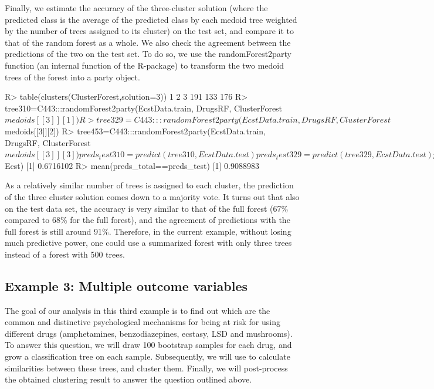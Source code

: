 Finally, we estimate the accuracy of the three-cluster solution (where the predicted class is the average of the predicted class by each medoid tree weighted by the number of trees assigned to its cluster) on the test set, and compare it to that of the random forest as a whole. We also check the agreement between the predictions of the two on the test set. To do so, we use the randomForest2party function (an internal function of the R-package) to transform the two medoid trees of the forest into a party object. 
\begin{example}
R> table(clusters(ClusterForest,solution=3))
  1   2   3 
191 133 176 
R> tree310=C443:::randomForest2party(EcstData.train, DrugsRF, ClusterForest$medoids[[3]][1])
R> tree329=C443:::randomForest2party(EcstData.train, DrugsRF, ClusterForest$medoids[[3]][2])
R> tree453=C443:::randomForest2party(EcstData.train, DrugsRF, ClusterForest$medoids[[3]][3])

preds_test310=predict(tree310,EcstData.test )
preds_test329=predict(tree329,EcstData.test )
preds_test453= predict(tree453,EcstData.test )
preds_total = round(((as.numeric(preds_test310)-1)*table(clusters(ClusterForest,solution=3))[1]+
(as.numeric(preds_test329)-1)*table(clusters(ClusterForest,solution=3))[2]+
(as.numeric(preds_test453)-1)*table(clusters(ClusterForest,solution=3))[3])/500 , 0)

R> mean(preds_total==EcstData.test$Ecst)
[1]  0.6716102
R> mean(preds_total==preds_test)
[1] 0.9088983

\end{example}
As a relatively similar number of trees is assigned to each cluster, the prediction of the three cluster solution comes down to a majority vote. It turns out that also on the test data set, the accuracy is very similar to that of the full forest (67\% compared to 68\% for the full forest), and the agreement of predictions with the full forest is still around 91\%. Therefore, in the current example,  without losing much predictive power, one could use a summarized forest with only three trees instead of a forest with 500 trees. 



\subsection{Example 3: Multiple outcome variables} \label{sec:illustration3}
The goal of our analysis in this third example is to find out which are the common and distinctive psychological mechanisms for being at risk for using different drugs (amphetamines, benzodiazepines, ecstasy, LSD and mushrooms). To answer this question, we will draw 100 bootstrap samples for each drug, and grow a classification tree on each sample. Subsequently, we will use  to calculate similarities between these trees, and cluster them. Finally, we will post-process the obtained clustering result to answer the question outlined above. 
 
